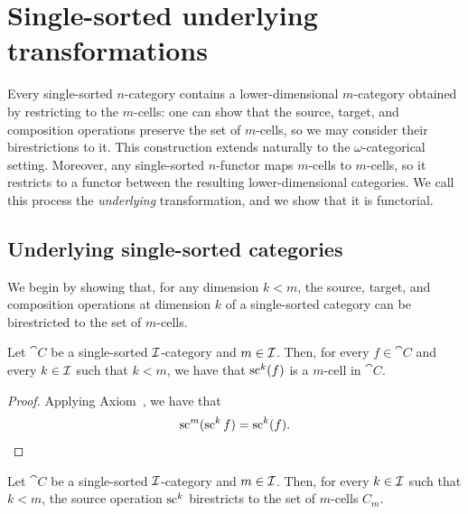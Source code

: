 \chapter{Single-sorted underlying transformations}
\label{ch:ss_underlying}

Every single-sorted $n$-category contains a lower-dimensional $m$-category obtained by restricting
to the $m$-cells: one can show that the source, target, and composition operations preserve the set
of $m$-cells, so we may consider their birestrictions to it. This construction extends naturally to
the $\omega$-categorical setting. Moreover, any single-sorted $n$-functor maps $m$-cells to
$m$-cells, so it restricts to a functor between the resulting lower-dimensional categories. We call
this process the \emph{underlying} transformation, and we show that it is functorial.

\section{Underlying single-sorted categories}

We begin by showing that, for any dimension $k < m$, the source, target, and composition operations
at dimension $k$ of a single-sorted category can be birestricted to the set of $m$-cells.

\begin{lemma}
  \label{lem:SingleSorted_underlying_source_is_cell}
  \leanok
  Let $\cat{C}$ be a single-sorted $\mathcal{I}$-category and $m \in \mathcal{I}$. Then, for every $f \in
  \cat{C}$ and every $k \in \mathcal{I}$ such that $k < m$, we have that $\operatorname{sc}^k (f)$ is a $m$-cell in
  $\cat{C}$.
\end{lemma}

\begin{proof}
  \leanok
  Applying Axiom~, we have that
  \[
    \operatorname{sc}^m (\operatorname{sc}^k f) = \operatorname{sc}^k (f).
  \]
\end{proof}

\begin{corollary}
  \label{cor:SingleSorted_underlying_source_birestriction}
  \leanok
  Let $\cat{C}$ be a single-sorted $\mathcal{I}$-category and $m \in \mathcal{I}$. Then, for every $k \in
  \mathcal{I}$ such that $k < m$, the source operation $\operatorname{sc}^k$ birestricts to the set of $m$-cells $C_m$.
\end{corollary}


